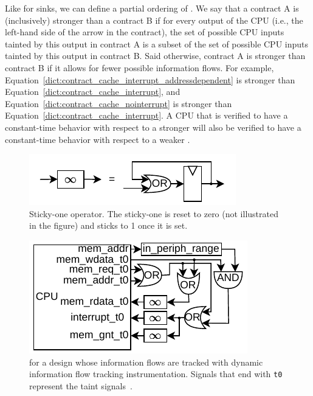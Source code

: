 Like for sinks, we can define a partial ordering of \pics.
We say that a contract A is (inclusively) stronger than a contract B if for every output of the CPU (i.e., the left-hand side of the arrow in the contract), the set of possible CPU inputs tainted by this output in contract A is a subset of the set of possible CPU inputs tainted by this output in contract B.
Said otherwise, contract A is stronger than contract B if it allows for fewer possible information flows.
For example, Equation~\ref{dict:contract_cache_interrupt_addressdependent} is stronger than Equation~\ref{dict:contract_cache_interrupt}, and Equation~\ref{dict:contract_cache_nointerrupt} is stronger than Equation~\ref{dict:contract_cache_interrupt}.
A CPU that is verified to have a constant-time behavior with respect to a stronger \pic will also be verified to have a constant-time behavior with respect to a weaker \pic.

\begin{figure}
    \begin{center}
    \includegraphics[width=.7\columnwidth]{figures/stickyone/stickyone.pdf}
    \end{center}
    \vspace*{-1em}
    \caption{Sticky-one operator. The sticky-one is reset to zero (not illustrated in the figure) and sticks to 1 once it is set.}
    \label{fig:stickyone}
    \vspace*{-.4em}
\end{figure}


\begin{figure}[t]
    \begin{center}
    \includegraphics[width=.7\columnwidth]{figures/picinstrum_taints/picinstrum_taints.pdf}
    \end{center}
    \vspace*{-1em}
    \caption{\Pici for a design whose information flows are tracked with dynamic information flow tracking instrumentation. Signals that end with \texttt{t0} represent the taint signals~\cite{tiwari2009complete,solt2022cellift}.
    }
    \label{fig:pic_instrum_taints}
    \vspace*{-.4em}
\end{figure}

